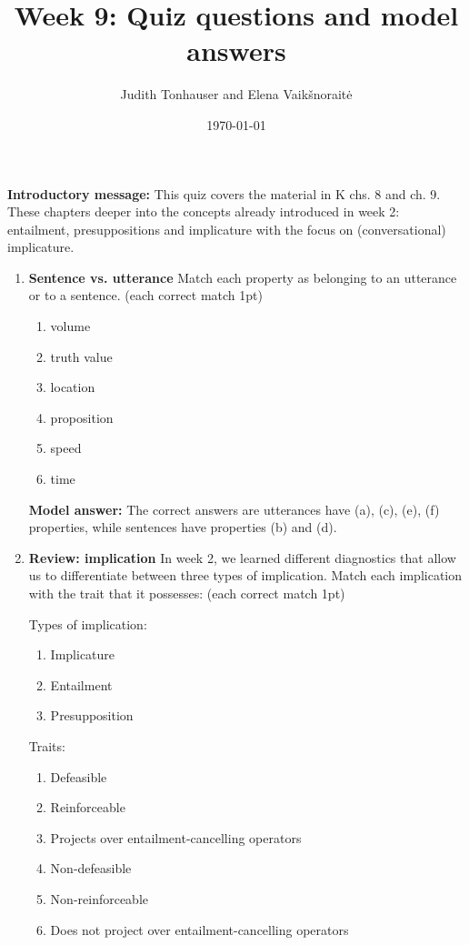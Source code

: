 \documentclass[a4,11pt]{article}
\title{Week 9: Quiz questions and model answers}
\author{Judith Tonhauser and Elena Vaik\v snorait\.{e} }
\date{\today}
\newcommand{\6}{\mbox{$[\hspace*{-.6mm}[$}}
\newcommand{\9}{\mbox{$]\hspace*{-.6mm}]$}}
\begin{document}
\maketitle

{\bf Introductory message:} This quiz covers the material in K chs. 8 and ch. 9. These chapters deeper into the concepts already introduced in week 2: entailment, presuppositions and implicature with the focus on (conversational) implicature.

\begin{enumerate}[leftmargin = 12pt]

\item { \bf Sentence vs. utterance} Match each property as belonging to an utterance or to a sentence. (each correct match 1pt)

\begin{enumerate}[noitemsep]
\item volume
\item truth value
\item location
\item proposition
\item speed
\item time
\end{enumerate}

{ \bf Model answer:} The correct answers are utterances have (a), (c), (e), (f) properties, while sentences have properties (b) and (d).


\item { \bf Review: implication} In week 2, we learned different diagnostics that allow us to differentiate between three types of implication. Match each implication with the trait that it possesses: (each correct match 1pt)

Types of implication:
\begin{enumerate}[noitemsep]
\item Implicature
\item Entailment
\item Presupposition
\end{enumerate}

Traits:
\begin{enumerate}[noitemsep]
\item Defeasible
\item Reinforceable
\item Projects over entailment-cancelling operators
\item Non-defeasible
\item Non-reinforceable
\item Does not project over entailment-cancelling operators
\end{enumerate}


\end{enumerate}
\end{document}
